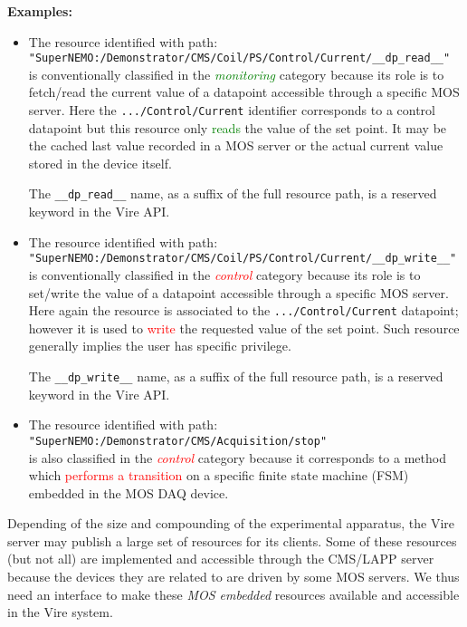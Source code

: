 \noindent\textbf{Examples:}
\begin{itemize}
\item The resource identified with path: \\
  \verb|"SuperNEMO:/Demonstrator/CMS/Coil/PS/Control/Current/__dp_read__"|\\
  is  conventionally  classified  in  the  \textcolor{green}{\emph{monitoring}}  category
  because its role  is to fetch/read the current value  of a datapoint
  accessible    through   a    specific   MOS    server.   Here    the
  \texttt{.../Control/Current}  identifier  corresponds to  a  control
  datapoint but  this resource only \textcolor{green}{reads}  the value
  of the set point. It may be the cached last value recorded in a MOS server
  or the actual current value stored in the device itself.

  The \verb+__dp_read__+ name, as a  suffix of the full resource path,
  is a reserved keyword in the Vire API.

\item The resource identified with path: \\
  \verb|"SuperNEMO:/Demonstrator/CMS/Coil/PS/Control/Current/__dp_write__"|\\
  is conventionally classified in  the \textcolor{red}{\emph{control}} category because
  its role is to set/write the value of a datapoint accessible through
  a specific MOS server. Here again  the resource is associated to the
  \texttt{.../Control/Current}  datapoint;  however   it  is  used  to
  \textcolor{red}{write} the requested value of the set point. Such resource
  generally implies the user has specific privilege.

  The \verb+__dp_write__+ name, as a suffix of the full resource path,
  is a reserved keyword in the Vire API.

\item The resource identified with path: \\
  \verb|"SuperNEMO:/Demonstrator/CMS/Acquisition/stop"|\\
  is also  classified in the  \textcolor{red}{\emph{control}} category
  because it corresponds to  a method which \textcolor{red}{performs a
    transition} on a  specific finite state machine  (FSM) embedded in
  the MOS DAQ device.
\end{itemize}

Depending of the  size and compounding of  the experimental apparatus,
the  Vire  server  may  publish  a large  set  of  resources  for  its
clients. Some  of these  resources (but not  all) are  implemented and
accessible through  the CMS/LAPP server  because the devices  they are
related to are driven by some  MOS servers.  We thus need an interface
to make  these \emph{MOS embedded} resources  available and accessible
in the Vire system.

